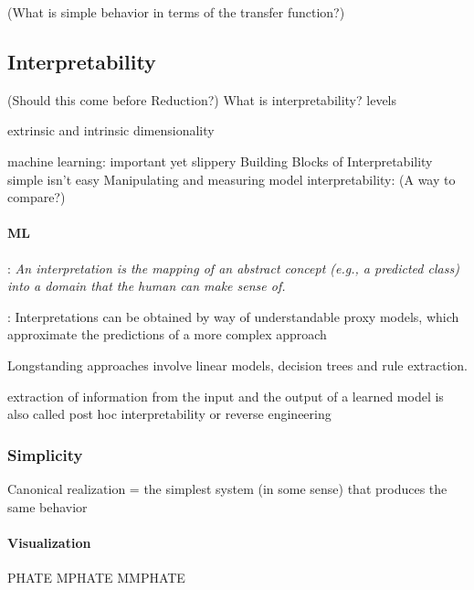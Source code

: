 \documentclass{article}
\newcommand{\ascomment}[1]{\textcolor{ascolor}{(#1)}}
\theoremstyle{definition} \newtheorem{definition}{Definition}  \newtheorem{example}{Example}
\theoremstyle{remark} \newtheorem{remark}{Remark}
\newcounter{ct}
\begin{document}
\ascomment{What is simple behavior in terms of the transfer function?}


\subsection{Interpretability}
\ascomment{Should this come before Reduction?}
What is interpretability? \citep{erasmus2021interpretability}
\citep{madsen2024interpretability}
levels \citep{hochstein2022levels}

\citep{whiteway2019interpretable}
\citep{kar2022interpretability}
extrinsic and intrinsic dimensionality\citep{jazayeri2021interpreting}

 machine learning: important yet slippery\citep{lipton2018mythos}	
 Building Blocks of Interpretability \citep{olah2018interpretability}
\citep{beisbart2022interpretability}
simple isn't easy \citep{raz2024ml}
Manipulating and measuring model interpretability\citep{poursabzi2021manipulating}: \ascomment{A way to compare?}
\citep{he2024multilevel}

\paragraph{ML}
\citep{montavon2018methods}: \emph{An interpretation is the mapping of an abstract concept (e.g., a predicted class) into a domain that the human can make sense of.}

\citep{ehrhardt2017learning, guidotti2018survey}: Interpretations can be obtained by way of understandable proxy models, which approximate the predictions of a more complex approach

Longstanding approaches involve linear models, decision trees and rule extraction.

extraction of information from the input and the output of a learned model is also called post hoc interpretability or reverse engineering


\subsubsection{Simplicity}
\citep{gao2015simplicity}
\citep{dyer2023simplest}
\citep{quinn2022information}

Canonical realization = the simplest system (in some sense) that produces the same behavior


\paragraph{Visualization}
\citep{deregt2017understanding}
\citep{karpathy2015visualizing}
PHATE \citep{moon2017visualizing}
MPHATE\citep{gigante2019visualizing}
MMPHATE\citep{xie2024multiway} 
\citep{madsen2019visualizing}
\end{document}
